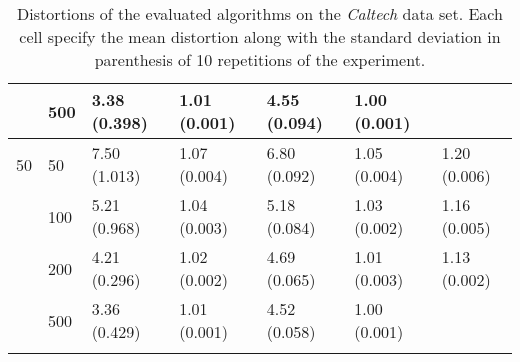 \begin{longtable}{lllllll}
   & 500 &  3.38 (0.398) &   1.01 (0.001) &  4.55 (0.094) &         1.00 (0.001) &  \\
 \midrule
50 & 50  &  7.50 (1.013) &   1.07 (0.004) &  6.80 (0.092) &         1.05 (0.004) &  1.20 (0.006) \\
   & 100 &  5.21 (0.968) &   1.04 (0.003) &  5.18 (0.084) &         1.03 (0.002) &  1.16 (0.005) \\
   & 200 &  4.21 (0.296) &   1.02 (0.002) &  4.69 (0.065) &         1.01 (0.003) &  1.13 (0.002) \\
   & 500 &  3.36 (0.429) &   1.01 (0.001) &  4.52 (0.058) &         1.00 (0.001) &            \\
\bottomrule
\caption{Distortions of the evaluated algorithms on the \textit{Caltech} data set. Each cell specify the mean distortion along with the standard deviation in parenthesis of 10 repetitions of the experiment.}
\label{tab:distortions-mean-std-caltech}
\end{longtable}

